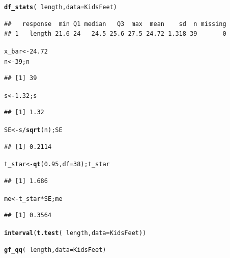 \documentclass[twoside]{book}\usepackage[]{graphicx}\usepackage[]{xcolor}
\makeatletter
\newcommand{\hlnum}[1]{\textcolor[rgb]{0.686,0.059,0.569}{#1}}%
\newcommand{\hlopt}[1]{\textcolor[rgb]{0,0,0}{#1}}%
\newcommand{\hlstd}[1]{\textcolor[rgb]{0.345,0.345,0.345}{#1}}%
\newcommand{\hlkwb}[1]{\textcolor[rgb]{0.69,0.353,0.396}{#1}}%
\newcommand{\hlkwc}[1]{\textcolor[rgb]{0.333,0.667,0.333}{#1}}%
\newcommand{\hlkwd}[1]{\textcolor[rgb]{0.737,0.353,0.396}{\textbf{#1}}}%
\newenvironment{kframe}{%
 \def\at@end@of@kframe{}%
 \ifinner\ifhmode%
  \def\at@end@of@kframe{\end{minipage}}%
  \begin{minipage}{\columnwidth}%
 \fi\fi%
 \def\FrameCommand##1{\hskip\@totalleftmargin \hskip-\fboxsep
 \colorbox{shadecolor}{##1}\hskip-\fboxsep
     \hskip-\linewidth \hskip-\@totalleftmargin \hskip\columnwidth}%
 \MakeFramed {\advance\hsize-\width
   \@totalleftmargin\z@ \linewidth\hsize
   \@setminipage}}%
 {\par\unskip\endMakeFramed%
 \at@end@of@kframe}
\newenvironment{knitrout}{}{} %
\makeatother
\begin{document}
\begin{solution}
\begin{knitrout}
\color{fgcolor}\begin{kframe}
\begin{alltt}
\hlkwd{df_stats}\hlstd{(} \hlopt{~} \hlstd{length,} \hlkwc{data} \hlstd{= KidsFeet)}
\end{alltt}
\begin{verbatim}
##   response  min Q1 median   Q3  max  mean    sd  n missing
## 1   length 21.6 24   24.5 25.6 27.5 24.72 1.318 39       0
\end{verbatim}
\begin{alltt}
\hlstd{x_bar} \hlkwb{<-} \hlnum{24.72}
\hlstd{n} \hlkwb{<-} \hlnum{39}\hlstd{; n}
\end{alltt}
\begin{verbatim}
## [1] 39
\end{verbatim}
\begin{alltt}
\hlstd{s} \hlkwb{<-} \hlnum{1.32}\hlstd{; s}
\end{alltt}
\begin{verbatim}
## [1] 1.32
\end{verbatim}
\begin{alltt}
\hlstd{SE} \hlkwb{<-} \hlstd{s} \hlopt{/} \hlkwd{sqrt}\hlstd{(n) ; SE}
\end{alltt}
\begin{verbatim}
## [1] 0.2114
\end{verbatim}
\begin{alltt}
\hlstd{t_star} \hlkwb{<-} \hlkwd{qt}\hlstd{(}\hlnum{0.95}\hlstd{,} \hlkwc{df} \hlstd{=} \hlnum{38}\hlstd{) ; t_star}
\end{alltt}
\begin{verbatim}
## [1] 1.686
\end{verbatim}
\begin{alltt}
\hlstd{me} \hlkwb{<-} \hlstd{t_star} \hlopt{*} \hlstd{SE; me}
\end{alltt}
\begin{verbatim}
## [1] 0.3564
\end{verbatim}
\begin{alltt}
\hlkwd{interval}\hlstd{(}\hlkwd{t.test}\hlstd{(} \hlopt{~}\hlstd{length,} \hlkwc{data} \hlstd{= KidsFeet))}
\end{alltt}


{\ttfamily\noindent\bfseries{}}\begin{alltt}
\hlkwd{gf_qq}\hlstd{(} \hlopt{~}\hlstd{length,} \hlkwc{data} \hlstd{= KidsFeet)}
\end{alltt}
\end{kframe}


\end{knitrout}
\end{solution}
\end{document}
